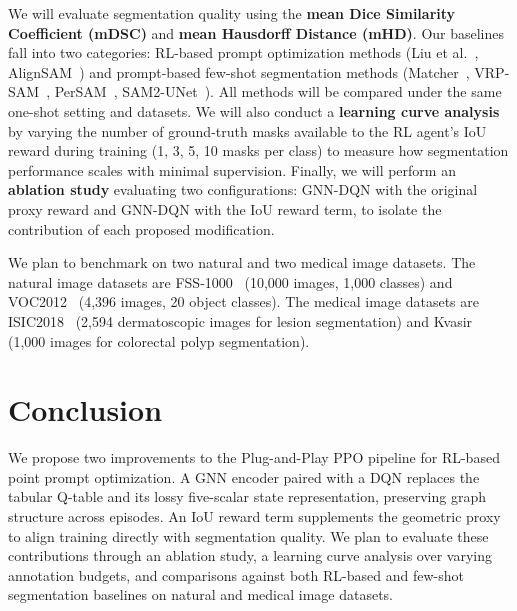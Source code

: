 \documentclass[12pt]{article}
\begin{document}
We will evaluate segmentation quality using the \textbf{mean Dice Similarity Coefficient (mDSC)} and \textbf{mean Hausdorff Distance (mHD)}. Our baselines fall into two categories: RL-based prompt optimization methods (Liu et al.~\cite{Liu2025PPO}, AlignSAM~\cite{Huang2024AlignSAM}) and prompt-based few-shot segmentation methods (Matcher~\cite{Liu2023Matcher}, VRP-SAM~\cite{Sun2024VRPSAM}, PerSAM~\cite{Zhang2023PerSAM}, SAM2-UNet~\cite{Xiong2024SAM2UNet}). All methods will be compared under the same one-shot setting and datasets. We will also conduct a \textbf{learning curve analysis} by varying the number of ground-truth masks available to the RL agent's IoU reward during training (1, 3, 5, 10 masks per class) to measure how segmentation performance scales with minimal supervision. Finally, we will perform an \textbf{ablation study} evaluating two configurations: GNN-DQN with the original proxy reward and GNN-DQN with the IoU reward term, to isolate the contribution of each proposed modification.

We plan to benchmark on two natural and two medical image datasets. The natural image datasets are FSS-1000~\cite{Li2020FSS1000} (10,000 images, 1,000 classes) and VOC2012~\cite{Shetty2016PascalVOC} (4,396 images, 20 object classes). The medical image datasets are ISIC2018~\cite{Codella2019ISIC} (2,594 dermatoscopic images for lesion segmentation) and Kvasir~\cite{Jha2020KvasirSEG} (1,000 images for colorectal polyp segmentation).

\section{Conclusion}

We propose two improvements to the Plug-and-Play PPO pipeline for RL-based point prompt optimization. A GNN encoder paired with a DQN replaces the tabular Q-table and its lossy five-scalar state representation, preserving graph structure across episodes. An IoU reward term supplements the geometric proxy to align training directly with segmentation quality. We plan to evaluate these contributions through an ablation study, a learning curve analysis over varying annotation budgets, and comparisons against both RL-based and few-shot segmentation baselines on natural and medical image datasets.



\end{document}
